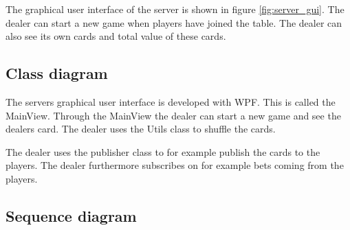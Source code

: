 The graphical user interface of the server is shown in figure \ref{fig:server_gui}. The dealer can start a new game when players have joined the table. The dealer can also see its own cards and total value of these cards.  

\FloatBarrier

\subsection{Class diagram}
The servers graphical user interface is developed with WPF. This is called the MainView. Through the MainView the dealer can start a new game and see the dealers card. The dealer uses the Utils class to shuffle the cards. 

The dealer uses the publisher class to for example publish the cards to the players. The dealer furthermore subscribes on for example bets coming from the players.

\FloatBarrier

\subsection{Sequence diagram}
